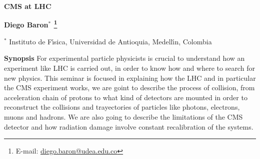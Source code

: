 \documentclass[a4paper,11pt]{article}
\newcommand{\abstracttitle}[1]{
 \begin{center}{\Large {\bf #1}}\end{center}
}
\newcommand{\authors}[1]{
 \vspace*{-0.3cm}
 \begin{center} {\bf #1} \end{center}
 \vspace*{-0.3cm}
}
\newcommand{\addresses}[1]{
 \begin{center} {\small #1} \end{center}
}
\newcommand{\synopsis}[1]{
 \begin{center}
 \setstretch{0.75}
 \begin{minipage}[t]{16cm}
   {\footnotesize {\bf Synopsis} #1 }
 \end{minipage}
 \setstretch{1.0}
 \end{center}
}
\newcommand{\writeto}[1]{
 \hspace*{-2.5mm} \footnote{E-mail: \href{mailto:#1}{#1}}\hspace*{-1.5mm}
}
\begin{document}
\abstracttitle{
CMS at LHC
}

\authors{
Diego Baron$^{\ast}$\writeto{diego.baron@udea.edu.co}


}

\addresses{
$^\ast$ Instituto de F\'{\i}sica, Universidad de Antioquia, Medell\'{\i}n, Colombia \\
}

\synopsis{
For experimental particle physicists is crucial to understand how an experiment like LHC is carried out, in order to know how and where to search for new physics. This seminar is focused in explaining how the LHC and in particular the CMS experiment works, we are goint to describe the process of collision, from acceleration chain of protons to what kind of detectors are mounted in order to reconstruct the collisions and trayectories of particles like photons, electrons, muons and hadrons. We are also going to describe the limitations of the CMS detector and how radiation damage involve constant recalibration of the systems.
}
\end{document}
